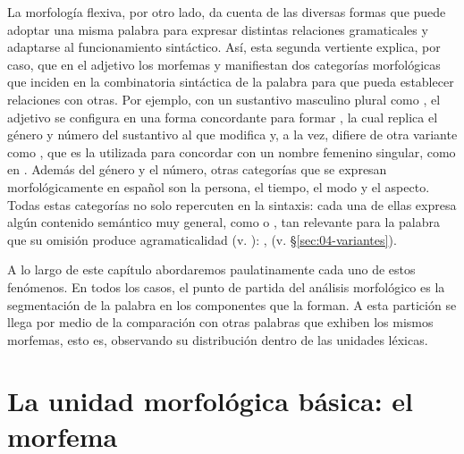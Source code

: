 La morfología flexiva, por otro lado, da cuenta de las diversas formas que puede
adoptar una misma palabra para expresar distintas relaciones gramaticales y
adaptarse al funcionamiento sintáctico. Así, esta segunda vertiente explica, por
caso, que en el adjetivo  los morfemas  y
 manifiestan dos categorías morfológicas que inciden en la combinatoria
sintáctica de la palabra para que pueda establecer relaciones con otras. Por
ejemplo, con un sustantivo masculino plural como , el adjetivo se
configura en una forma concordante para formar , la
cual replica el género y número del sustantivo al que modifica y, a la vez,
difiere de otra variante como , que es la utilizada para
concordar con un nombre femenino singular, como en .
Además del género y el número, otras categorías que se expresan
morfológicamente en español son la persona, el tiempo, el modo y el aspecto.
Todas estas categorías no solo repercuten en la sintaxis: cada una de ellas
expresa algún contenido semántico muy general, como  o
, tan relevante para la palabra que su omisión produce
agramaticalidad (v. ): ,
 (v. §\ref{sec:04-variantes}).

A lo largo de este capítulo abordaremos paulatinamente cada uno de estos
fenómenos. En todos los casos, el punto de partida del análisis morfológico es la
segmentación de la palabra en los componentes que la forman. A esta partición se
llega por medio de la comparación con otras palabras que exhiben los mismos
morfemas, esto es, observando su distribución dentro de las unidades léxicas.

\section{La unidad morfológica básica: el morfema}\label{sec:04-morfema}


